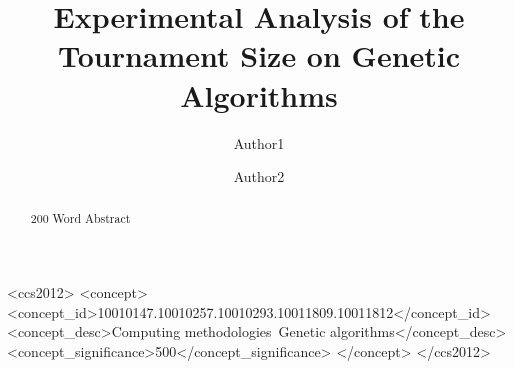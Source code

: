 \documentclass[sigconf, authordraft]{acmart}
\begin{document}
\title{Experimental Analysis of the Tournament Size on Genetic Algorithms}

\author{Author1}

\author{Author2}

\begin{abstract}
  200 Word Abstract
\end{abstract}

\begin{CCSXML}
<ccs2012>
<concept>
<concept_id>10010147.10010257.10010293.10011809.10011812</concept_id>
<concept_desc>Computing methodologies~Genetic algorithms</concept_desc>
<concept_significance>500</concept_significance>
</concept>
</ccs2012>
\end{CCSXML}




\maketitle

%

 






 
\end{document}
